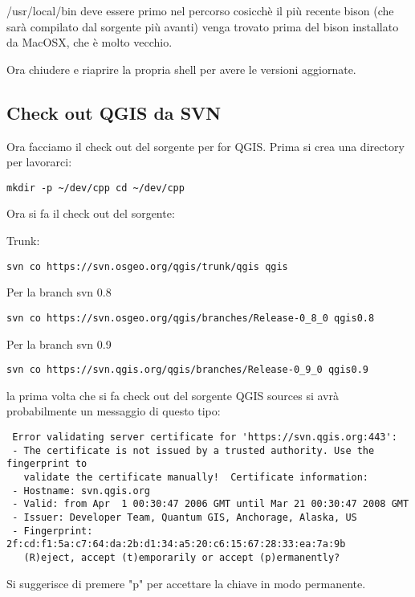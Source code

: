/usr/local/bin deve essere primo nel percorso cosicchè il più recente bison (che sarà compilato dal sorgente più avanti) venga trovato prima del bison installato da MacOSX, che è molto vecchio.

Ora chiudere e riaprire la propria shell per avere le versioni aggiornate.

\subsection{Check out QGIS da SVN}
Ora facciamo il check out del sorgente per for QGIS. Prima si crea una directory per lavorarci:

\begin{verbatim}
mkdir -p ~/dev/cpp cd ~/dev/cpp 
\end{verbatim}

Ora si fa il check out del sorgente:

Trunk:

\begin{verbatim}
svn co https://svn.osgeo.org/qgis/trunk/qgis qgis 
\end{verbatim}

Per la branch svn 0.8 

\begin{verbatim}
svn co https://svn.osgeo.org/qgis/branches/Release-0_8_0 qgis0.8
\end{verbatim}

Per la branch svn 0.9 

\begin{verbatim}
svn co https://svn.qgis.org/qgis/branches/Release-0_9_0 qgis0.9
\end{verbatim}

la prima volta che si fa check out del sorgente QGIS sources si avrà probabilmente un messaggio di questo tipo:

\begin{verbatim}
 Error validating server certificate for 'https://svn.qgis.org:443':
 - The certificate is not issued by a trusted authority. Use the fingerprint to
   validate the certificate manually!  Certificate information:
 - Hostname: svn.qgis.org
 - Valid: from Apr  1 00:30:47 2006 GMT until Mar 21 00:30:47 2008 GMT
 - Issuer: Developer Team, Quantum GIS, Anchorage, Alaska, US
 - Fingerprint: 2f:cd:f1:5a:c7:64:da:2b:d1:34:a5:20:c6:15:67:28:33:ea:7a:9b
   (R)eject, accept (t)emporarily or accept (p)ermanently?  
\end{verbatim}

Si suggerisce di premere "p" per accettare la chiave in modo permanente.


